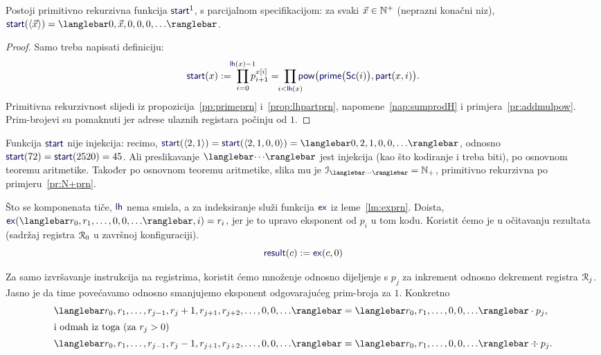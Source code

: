 \begin{lema}[{name=[primitivna rekurzivnost generatora početne konfiguracije]}]\label{lm:startprn}
    Postoji primitivno rekurzivna funkcija $\f{start}^1$\!, s parcijalnom specifikacijom: za svaki $\vec x\in{\mathbb N}^+$ (neprazni konačni niz), $\f{start}(\langle\vec x\rangle)=\knk{0,\vec x,0,0,0,\dotsc}$.
\end{lema}
\begin{proof}
Samo treba napisati definiciju:
\begin{equation}
    \f{start}(x):=\;\prod_{i=0}^{\mathclap{\f{lh}(x)-1}}p_{i+1}^{x[i]}=\;\prod_{\mathclap{i<\f{lh}(x)}}\f{pow}\bigl(\f{prime}\bigl(\f{Sc}(i)\bigr),\f{part}(x,i)\bigr)\text.
\end{equation}
Primitivna rekurzivnost slijedi iz propozicija~\ref{pp:primeprn} i~\ref{prop:lhpartprn}, napomene~\ref{nap:sumprodH} i primjera~\ref{pr:addmulpow}. Prim-brojevi su pomaknuti jer adrese ulaznih registara počinju od $1$.
\end{proof}

Funkcija $\f{start}$ nije injekcija: recimo, $\f{start}(\langle2,1\rangle)=\f{start}(\langle2,1,0,0\rangle)=\knk{0,2,1,0,0,\dotsc}$, odnosno $\f{start}(72)=\f{start}(2520)=45$. Ali preslikavanje $\knk{\cdots}$ jest injekcija (kao što kodiranje i treba biti), po osnovnom teoremu aritmetike. Također po osnovnom teoremu aritmetike, slika mu je $\im{\knk{\cdots}}=\N_+$, primitivno rekurzivna po primjeru~\ref{pr:N+prn}.

Što se komponenata tiče, $\f{lh}$ nema smisla, a za indeksiranje služi funkcija $\f{ex}$ iz leme~\ref{lm:exprn}. Doista, $\f{ex}(\knk{r_0,r_1,\dotsc,0,0,\dotsc},i)=r_i$, jer je to upravo eksponent od $p_i$ u tom kodu. Koristit ćemo je u očitavanju rezultata (sadržaj registra $\mathcal R_{0}$ u završnoj konfiguraciji).
\begin{equation}\label{eq:resultdef}
    \f{result}(c):=\f{ex}(c,0)
\end{equation}

Za samo izvršavanje instrukcija na registrima, koristit ćemo množenje odnosno dijeljenje s $p_j$ za inkrement odnosno dekrement registra $\mathcal R_{j}$. Jasno je da time povećavamo odnosno smanjujemo eksponent odgovarajućeg prim-broja za $1$. Konkretno
\begin{align}
\label{eq:knkppj}\knk{r_0,r_1,\dotsc,r_{j-1},r_j+1,r_{j+1},r_{j+2},\dotsc,0,0,\dotsc}
&=
\knk{r_0,r_1,\dotsc,0,0,\dotsc}\cdot p_j\text,
    \\\intertext{i odmah iz toga (za $r_j>0$)}
\label{eq:knkkpj}\knk{r_0,r_1,\dotsc,r_{j-1},r_j-1,r_{j+1},r_{j+2},\dotsc,0,0,\dotsc}
&=
\knk{r_0,r_1,\dotsc,0,0,\dotsc}\div p_j\text.
\end{align}

